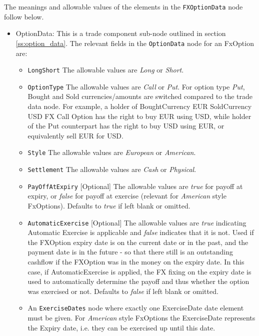The meanings and allowable values of the elements in the \lstinline!FXOptionData! node follow below.

\begin{itemize}
\item OptionData: This is a trade component sub-node outlined in section \ref{ss:option_data}. 
The relevant fields in the \lstinline!OptionData! node for an FxOption are:

\begin{itemize}
\item \lstinline!LongShort! The allowable values are \emph{Long} or \emph{Short}.

\item \lstinline!OptionType! The allowable values are \emph{Call} or \emph{Put}. For option type \emph{Put}, Bought and Sold currencies/amounts are switched compared to the trade data node.
For example, a holder of BoughtCurrency EUR SoldCurrency USD FX Call Option has the right to buy EUR using USD, while
holder of the Put counterpart has the right to buy USD using EUR, or equivalently sell EUR for USD.

\item  \lstinline!Style! The allowable values are \emph{European} or \emph{American}.

\item  \lstinline!Settlement! The allowable values are \emph{Cash} or \emph{Physical}.

\item \lstinline!PayOffAtExpiry! [Optional] The allowable values are \emph{true} for payoff at expiry, or \emph{false} for payoff at exercise (relevant for \emph{American} style FxOptions). Defaults to \emph{true} if left blank or omitted.

\item \lstinline!AutomaticExercise! [Optional] The allowable values are \emph{true} indicating Automatic Exercise is applicable and  \emph{false} indicates that it is not. Used if the FXOption expiry date is on the current
date or in the past, and the payment date is in the future - so that there still is
an outstanding cashflow if the FXOption was in the money on the expiry date. In
this case, if AutomaticExercise is applied, the FX fixing
on the expiry date is used to automatically determine the payoff and thus
whether the option was exercised or not. Defaults to \emph{false} if left blank or omitted.

\item An \lstinline!ExerciseDates! node where exactly one ExerciseDate date element must be given. For \emph{American} style FxOptions the ExerciseDate represents the Expiry date, i.e. they can be exercised up until this date. \\


\end{itemize}
\end{itemize}

